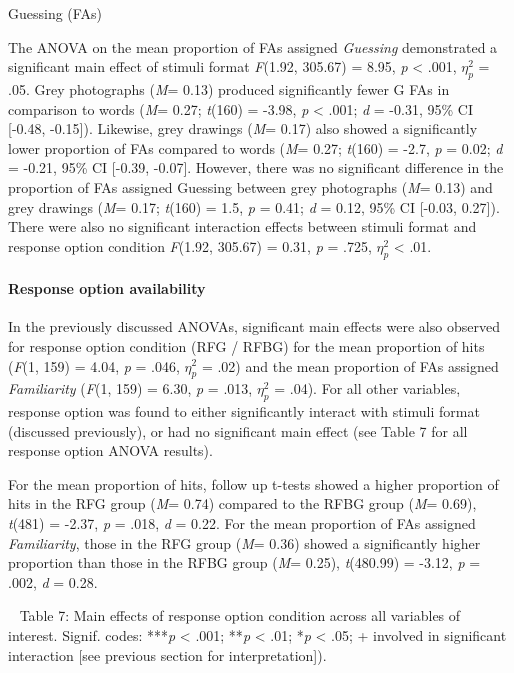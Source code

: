 \documentclass[
  11pt,
]{article}
\begin{document}
Guessing (FAs)

The ANOVA on the mean proportion of FAs assigned \emph{Guessing}
demonstrated a significant main effect of stimuli format \emph{F}(1.92,
305.67) = 8.95, \emph{p} \textless{} .001, \(\eta^2_p\) = .05. Grey
photographs (\emph{M}= 0.13) produced significantly fewer G FAs in
comparison to words (\emph{M}= 0.27; \emph{t}(160) = -3.98, \emph{p}
\textless{} .001; \emph{d} = -0.31, 95\% CI {[}-0.48, -0.15{]}).
Likewise, grey drawings (\emph{M}= 0.17) also showed a significantly
lower proportion of FAs compared to words (\emph{M}= 0.27; \emph{t}(160)
= -2.7, \emph{p} = 0.02; \emph{d} = -0.21, 95\% CI {[}-0.39, -0.07{]}.
However, there was no significant difference in the proportion of FAs
assigned Guessing between grey photographs (\emph{M}= 0.13) and grey
drawings (\emph{M}= 0.17; \emph{t}(160) = 1.5, \emph{p} = 0.41; \emph{d}
= 0.12, 95\% CI {[}-0.03, 0.27{]}). There were also no significant
interaction effects between stimuli format and response option condition
\emph{F}(1.92, 305.67) = 0.31, \emph{p} = .725, \(\eta^2_p\) \textless{}
.01.

\hypertarget{response-option-availability}{%
\paragraph{Response option
availability}\label{response-option-availability}}

In the previously discussed ANOVAs, significant main effects were also
observed for response option condition (RFG / RFBG) for the mean
proportion of hits (\emph{F}(1, 159) = 4.04, \emph{p} = .046,
\(\eta^2_p\) = .02) and the mean proportion of FAs assigned
\emph{Familiarity} (\emph{F}(1, 159) = 6.30, \emph{p} = .013,
\(\eta^2_p\) = .04). For all other variables, response option was found
to either significantly interact with stimuli format (discussed
previously), or had no significant main effect (see Table 7 for all
response option ANOVA results).

For the mean proportion of hits, follow up t-tests showed a higher
proportion of hits in the RFG group (\emph{M}= 0.74) compared to the
RFBG group (\emph{M}= 0.69), \emph{t}(481) = -2.37, \emph{p} = .018,
\emph{d} = 0.22. For the mean proportion of FAs assigned
\emph{Familiarity}, those in the RFG group (\emph{M}= 0.36) showed a
significantly higher proportion than those in the RFBG group (\emph{M}=
0.25), \emph{t}(480.99) = -3.12, \emph{p} = .002, \emph{d} = 0.28.

~ Table 7: Main effects of response option condition across all
variables of interest. Signif. codes: ***\emph{p} \textless{} .001;
**\emph{p} \textless{} .01; *\emph{p} \textless{} .05; + involved in
significant interaction {[}see previous section for interpretation{]}).
\end{document}
